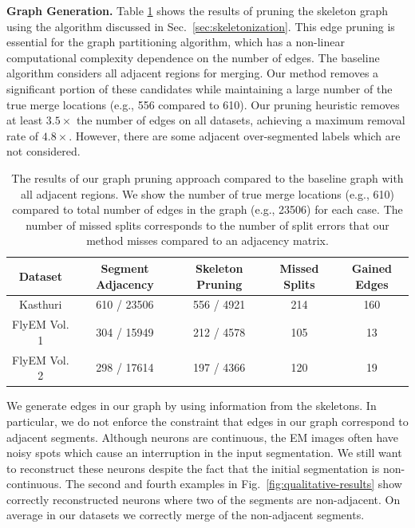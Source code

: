 \noindent\textbf{Graph Generation.}
Table \ref{table:skeletonization} shows the results of pruning the skeleton graph using the algorithm discussed in Sec.~\ref{sec:skeletonization}. 
This edge pruning is essential for the graph partitioning algorithm, which has a non-linear computational complexity dependence on the number of edges. 
The baseline algorithm considers all adjacent regions for merging. 
Our method removes a significant portion of these candidates while maintaining a large number of the true merge locations (e.g., 556 compared to 610). 
Our pruning heuristic removes at least $3.5\times$ the number of edges on all datasets, achieving a maximum removal rate of $4.8\times$.
However, there are some adjacent over-segmented labels which are not considered. 

\begin{table}
	\centering
	\small
	\setlength{\tabcolsep}{0.75em}
	\begin{tabular}{c c c c c} \hline
		\textbf{Dataset} & \textbf{Segment Adjacency} & \textbf{Skeleton Pruning} & \textbf{Missed Splits} & \textbf{Gained Edges} \\ \hline
		Kasthuri & 610 / 23506 & 556 / 4921 & 214 & 160 \\
		FlyEM Vol. 1 & 304 / 15949 & 212 / 4578 & 105 & 13 \\
		FlyEM Vol. 2 &  298 / 17614 & 197 / 4366 & 120 & 19 \\ \hline
	\end{tabular}
	\caption{The results of our graph pruning approach compared to the baseline graph with all adjacent regions. We show the number of true merge locations (e.g., 610) compared to total number of edges in the graph (e.g., 23506) for each case. The number of missed splits corresponds to the number of split errors that our method misses compared to an adjacency matrix.}
	\label{table:skeletonization}
\end{table}

We generate edges in our graph by using information from the skeletons. 
In particular, we do not enforce the constraint that edges in our graph correspond to adjacent segments.
Although neurons are continuous, the EM images often have noisy spots which cause an interruption in the input segmentation.
We still want to reconstruct these neurons despite the fact that the initial segmentation is non-continuous. 
The second and fourth examples in Fig.~\ref{fig:qualitative-results} show correctly reconstructed neurons where two of the segments are non-adjacent. 
On average in our datasets we correctly merge  of the non-adjacent segments. 


